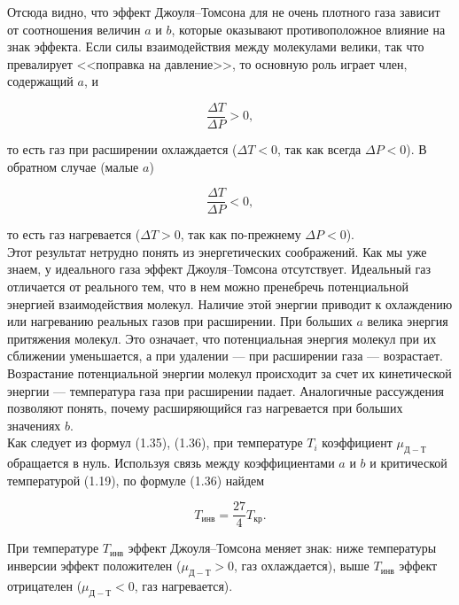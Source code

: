 Отсюда видно, что эффект Джоуля–Томсона для не очень плотного газа зависит от соотношения величин $a$ и $b$, которые оказывают противоположное влияние на знак эффекта. Если силы взаимодействия между молекулами велики, так что превалирует <<поправка на давление>>, то основную роль играет член, содержащий $a$, и

\begin{equation}
\dfrac{\Delta T}{\Delta P} > 0,
\end{equation}

то есть газ при расширении охлаждается ($\Delta T < 0$, так как всегда $\Delta P < 0$). В обратном случае (малые $a$)

\begin{equation}
\dfrac{\Delta T}{\Delta P} < 0,
\end{equation}

то есть газ нагревается ($\Delta T > 0$, так как по-прежнему $\Delta P < 0$).\\

Этот результат нетрудно понять из энергетических соображений. Как мы уже знаем, у идеального газа эффект Джоуля–Томсона отсутствует. Идеальный газ отличается от реального тем, что в нем можно пренебречь потенциальной энергией взаимодействия молекул. Наличие этой энергии приводит к охлаждению или нагреванию реальных газов при расширении. При больших $a$ велика энергия притяжения молекул. Это означает, что потенциальная энергия молекул при их сближении уменьшается, а при удалении --- при расширении газа --- возрастает. Возрастание потенциальной энергии молекул происходит за счет их кинетической энергии --- температура газа при расширении падает. Аналогичные рассуждения позволяют понять, почему расширяющийся газ нагревается при больших значениях $b$.\\

Как следует из формул (1.35), (1.36), при температуре $T_i$ коэффициент $\mu_{Д-Т} $ обращается в нуль. Используя связь между коэффициентами $a$ и $b$ и критической температурой (1.19), по формуле (1.36) найдем

\begin{equation}
T_{инв} = \dfrac{27}{4}T_{кр}.
\end{equation}


При температуре $T_{инв}$ эффект Джоуля–Томсона меняет знак: ниже температуры инверсии эффект положителен ($\mu_{Д-Т} > 0$, газ охлаждается), выше $T_{инв}$ эффект отрицателен ($\mu_{Д-Т} < 0$, газ нагревается).\\


